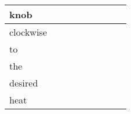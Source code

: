 \documentclass[landscape]{article}
\newcommand{\ssp}{\hspace{2pt}}
\begin{document}
\begin{tabular}{|l|p{10pt}|p{10pt}|p{10pt}|p{10pt}|p{10pt}|p{10pt}|p{10pt}|p{10pt}|}
\hline
\ssp knob \ssp&\hspace{2pt}&\hspace{2pt}&\hspace{2pt}&\hspace{2pt}&\hspace{2pt}&\hspace{2pt}&\hspace{2pt}&\hspace{2pt}\\
\hline
\ssp clockwise \ssp&\hspace{2pt}&\hspace{2pt}&\hspace{2pt}&\hspace{2pt}&\hspace{2pt}&\hspace{2pt}&\hspace{2pt}&\hspace{2pt}\\
\hline
\ssp to \ssp&\hspace{2pt}&\hspace{2pt}&\hspace{2pt}&\hspace{2pt}&\hspace{2pt}&\hspace{2pt}&\hspace{2pt}&\hspace{2pt}\\
\hline
\ssp the \ssp&\hspace{2pt}&\hspace{2pt}&\hspace{2pt}&\hspace{2pt}&\hspace{2pt}&\hspace{2pt}&\hspace{2pt}&\hspace{2pt}\\
\hline
\ssp desired \ssp&\hspace{2pt}&\hspace{2pt}&\hspace{2pt}&\hspace{2pt}&\hspace{2pt}&\hspace{2pt}&\hspace{2pt}&\hspace{2pt}\\
\hline
\ssp heat \ssp&\hspace{2pt}&\hspace{2pt}&\hspace{2pt}&\hspace{2pt}&\hspace{2pt}&\hspace{2pt}&\hspace{2pt}&\hspace{2pt}\\

\end{tabular}
\end{document}
